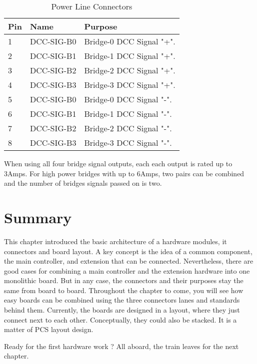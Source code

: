 \begin{table}[!ht]
    \begin{center}
        \caption{Power Line Connectors}
        \begin{tabular}{|l|l|p{}|}
            \toprule
            \textbf{Pin} & \textbf{Name} & \textbf{Purpose} \\
            \midrule
            1 & DCC-SIG-B0 & Bridge-0 DCC Signal "+". \\
            \midrule
            2 & DCC-SIG-B1 & Bridge-1 DCC Signal "+". \\
            \midrule
            3 & DCC-SIG-B2 & Bridge-2 DCC Signal "+". \\
            \midrule
            4 & DCC-SIG-B3 & Bridge-3 DCC Signal "+". \\
            \midrule
            5 & DCC-SIG-B0 & Bridge-0 DCC Signal "-". \\
            \midrule
            6 & DCC-SIG-B1 & Bridge-1 DCC Signal "-". \\
            \midrule
            7 & DCC-SIG-B2 & Bridge-2 DCC Signal "-". \\
            \midrule
            8 & DCC-SIG-B3 & Bridge-3 DCC Signal "-". \\
            \bottomrule
        \end{tabular}
    \end{center}
\end{table}

\FloatBarrier

When using all four bridge signal outputs, each each output is rated up to 3Amps. For high power bridges with up to 6Amps, two pairs can be combined and the number of bridges signals passed on is two.

\section{Summary}

This chapter introduced the basic architecture of a hardware modules, it connectors and board layout. A key concept is the idea of a common component, the main controller, and extension that can be connected. Nevertheless, there are good cases for combining a main controller and the extension hardware into one monolithic board. But in any case, the connectors and their purposes stay the same from board to board. Throughout the chapter to come, you will see how easy boards can be combined using the three connectors lanes and standards behind them. Currently, the boards are designed in a layout, where they just connect next to each other. Conceptually, they could also be stacked. It is a matter of PCS layout design.

Ready for the first hardware work ? All aboard, the train leaves for the next chapter.

